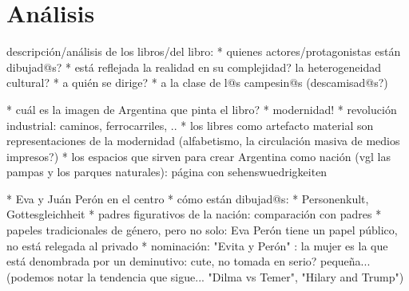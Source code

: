 \section{Análisis}

descripción/análisis de los libros/del libro:
* quienes actores/protagonistas están dibujad@s?
  * está reflejada la realidad en su complejidad? la heterogeneidad cultural?
* a quién se dirige?
  * a la clase de l@s campesin@s (descamisad@s?)

* cuál es la imagen de Argentina que pinta el libro?
  * modernidad!
    * revolución industrial: caminos, ferrocarriles, ..
    * los libres como artefacto material son representaciones de la modernidad (alfabetismo, la circulación masiva de medios impresos?)
  * los espacios que sirven para crear Argentina como nación (vgl las pampas y los parques naturales): página con sehenswuedrigkeiten

* Eva y Juán Perón en el centro
  * cómo están dibujad@s:
    * Personenkult, Gottesgleichheit
    * padres figurativos de la nación: comparación con padres
    * papeles tradicionales de género, pero no solo: Eva Perón tiene un papel público, no está relegada al privado
  * nominación: "Evita y Perón" : la mujer es la que está denombrada por un deminutivo: cute, no tomada en serio? pequeña... (podemos notar la tendencia que sigue... "Dilma vs Temer", "Hilary and Trump")
